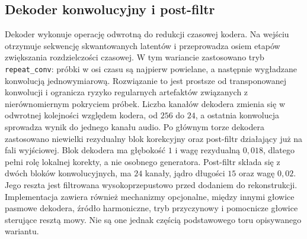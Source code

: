 \newpage

\subsection{Dekoder konwolucyjny i post-filtr}

Dekoder wykonuje operację odwrotną do redukcji czasowej kodera. Na wejściu otrzymuje sekwencję skwantowanych latentów i przeprowadza osiem etapów zwiększania rozdzielczości czasowej. W tym wariancie zastosowano tryb \texttt{repeat\_conv}: próbki w osi czasu są najpierw powielane, a następnie wygładzane konwolucją jednowymiarową. Rozwiązanie to jest prostsze od transponowanej konwolucji i ogranicza ryzyko regularnych artefaktów związanych z nierównomiernym pokryciem próbek. Liczba kanałów dekodera zmienia się w odwrotnej kolejności względem kodera, od \(256\) do \(24\), a ostatnia konwolucja sprowadza wynik do jednego kanału audio. Po głównym torze dekodera zastosowano niewielki rezydualny blok korekcyjny oraz post-filtr działający już na fali wyjściowej. Blok dekodera ma głębokość \(1\) i wagę rezydualną \(0{,}018\), dlatego pełni rolę lokalnej korekty, a nie osobnego generatora. Post-filtr składa się z dwóch bloków konwolucyjnych, ma \(24\) kanały, jądro długości \(15\) oraz wagę \(0{,}02\). Jego reszta jest filtrowana wysokoprzepustowo przed dodaniem do rekonstrukcji. Implementacja zawiera również mechanizmy opcjonalne, między innymi głowice pasmowe dekodera, źródło harmoniczne, tryb przyczynowy i pomocnicze głowice sterujące resztą mowy. Nie są one jednak częścią podstawowego toru opisywanego wariantu.

